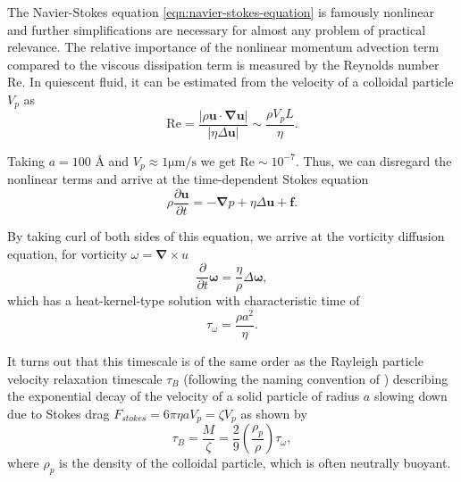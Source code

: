 \documentclass{doctoral}
\newcommand{\pd}{\partial}
\newcommand{\Reynolds}{\mathrm{Re}}
\begin{document}
The Navier-Stokes equation \eqref{eqn:navier-stokes-equation} is famously nonlinear and further simplifications are necessary for almost any problem of practical relevance.
The relative importance of the nonlinear momentum advection term compared to the viscous dissipation term is measured by the Reynolds number $\Reynolds$\cite{Reynolds_1883}.
In quiescent fluid, it can be estimated from the velocity of a colloidal particle $V_p$ as
\begin{equation}
    \Reynolds = \frac{|\rho \bm{u} \cdot \bm{\nabla}\bm{u}|}{|\eta \Delta \bm{u}|} \sim \frac{\rho V_p L}{\eta}.
    \label{eqn:reynolds-based-estimate}
\end{equation}

Taking $a = 100$ \AA{} and $V_p \approx 1 \mathrm{\mu m / s}$  we get $\Reynolds \sim 10^{-7}$.
Thus, we can disregard the nonlinear terms and arrive at the time-dependent Stokes equation
\begin{equation}
    \rho \frac{\pd \bm{u}}{\pd t} = - \bm{\nabla} p + \eta \Delta \bm{u} + \bm{f}.
    \label{eqn:time-dependent-stokes-equation}
\end{equation}

By taking curl of both sides of this equation, we arrive at the vorticity diffusion equation, for vorticity $\omega = \bm{\nabla} \times u$
\begin{equation}
    \frac{\pd}{\pd t} \bm{\omega}  = \frac{\eta}{\rho} \Delta \bm{\omega} , \label{eqn:vorticity-diffusion}
\end{equation}
which has a heat-kernel-type solution with characteristic time of
\begin{equation}
    \tau_\omega = \frac{\rho a^2}{\eta}.
    \label{eqn:vorticity-timescale}
\end{equation}

It turns out that this timescale is of the same order as the Rayleigh particle velocity relaxation timescale $\tau_B$ (following the naming convention of \textcite{vanKampen_2011}) describing the exponential decay of the velocity of a solid particle of radius $a$ slowing down due to Stokes drag $F_{stokes} = 6 \pi \eta a V_p = \zeta V_p$ as shown by
\begin{equation}
    \tau_B = \frac{M}{\zeta} = \frac{2}{9} \left( \frac{\rho_p}{\rho} \right) \tau_\omega, \label{eqn:raighley-timescale}
\end{equation}
where $\rho_p$ is the density of the colloidal particle, which is often neutrally buoyant.
\end{document}
